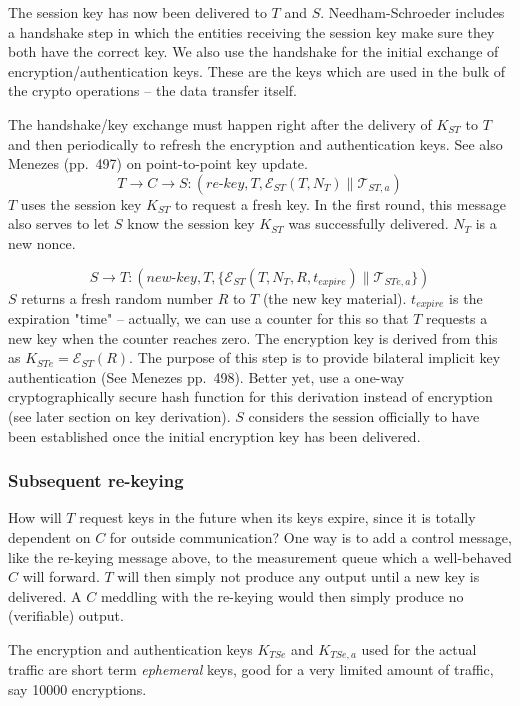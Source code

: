The session key has now been delivered to $T$ and $S$. Needham-Schroeder includes a handshake step in which the entities receiving the session key make sure they both have the correct key. We also use the handshake for the initial exchange of encryption/authentication keys. These are the keys which are used in the bulk of the crypto operations -- the data transfer itself.

The handshake/key exchange must happen right after the delivery of $K_{ST}$ to $T$ and then periodically to refresh the encryption and authentication keys. See also Menezes (pp.\ 497) on point-to-point key update.
\[
T \rightarrow C \rightarrow S: (\textit{re-key},T,\mathcal{E}_{ST}(T,N_T) \parallel \mathcal{T}_{ST,a})
\]
$T$ uses the session key $K_{ST}$ to request a fresh key. In the first round, this message also serves to let $S$ know the session key $K_{ST}$ was successfully delivered. $N_T$ is a new nonce.

\[
S \rightarrow T: (\textit{new-key},T, \{ \mathcal{E}_{ST}(T,N_T,R,t_{expire}) \parallel \mathcal{T}_{STe,a} \} )
\]
$S$ returns a fresh random number $R$ to $T$ (the new key material). $t_{expire}$ is the expiration "time" -- actually, we can use a counter for this so that $T$ requests a new key when the counter reaches zero. The encryption key is derived from this as $K_{STe}=\mathcal{E}_{ST}(R)$. The purpose of this step is to provide bilateral implicit key authentication (See Menezes pp.\ 498). Better yet, use a one-way cryptographically secure hash function for this derivation instead of encryption (see later section on key derivation). $S$ considers the session officially to have been established once the initial encryption key has been delivered.

\subsubsection{Subsequent re-keying}

How will $T$ request keys in the future when its keys expire, since it is totally dependent on $C$ for outside communication? One way is to add a control message, like the re-keying message above, to the measurement queue which a well-behaved $C$ will forward. $T$ will then simply not produce any output until a new key is delivered. A $C$ meddling with the re-keying would then simply produce no (verifiable) output.

The encryption and authentication keys $K_{TSe}$ and $K_{TSe,a}$ used for the actual traffic are short term \textit{ephemeral} keys, good for a very limited amount of traffic, say 10000 encryptions.

